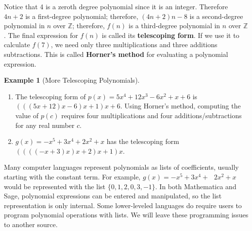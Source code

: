 \documentclass[10pt,]{book}
\newcommand{\terminology}[1]{\textbf{#1}}
\theoremstyle{plain}
\theoremstyle{definition}
\theoremstyle{definition}
\theoremstyle{definition}
\newtheorem{example}[theorem]{Example}
\theoremstyle{definition}
\numberwithin{equation}{section}
\begin{document}
Notice that 4 is a zeroth degree polynomial since it is an integer. Therefore \(4n + 2\) is a first-degree polynomial; therefore,
\((4n + 2) n - 8\) is a second-degree polynomial in \(n\) over \(\mathbb{Z}\); therefore, \(f(n)\) is a third-degree polynomial in \(n\) over \(\mathbb{Z}\). The final expression for \(f(n)\) is called its \terminology{telescoping form}. If we use it to calculate \(f(7)\),
we need only three multiplications and three additions subtractions. This is called \terminology{Horner's method} for evaluating a polynomial expression.%
\begin{example}[More Telescoping Polynomials]\label{ex-more-telescoping_}
\leavevmode%
\begin{enumerate}[label=\alph*]
\item\hypertarget{li-6}{} The telescoping form of \(p(x) = 5x^4 + 12x^3 -6x^2 + x + 6\) is \((((5x + 12) x - 6) x + 1) x + 6\). Using Horner's method, computing the value of \(p(c)\) requires four multiplications and four additions/subtractions for any real number \(c\).%
\item\hypertarget{li-7}{}\(g(x) = -x^5 + 3x^4 + 2x^2 + x\) has the telescoping form \(((((- x + 3) x ) x + 2) x + 1) x\).%
\end{enumerate}
%
\end{example}
\par
Many computer languages represent polynomials as lists of coefficients, usually starting with the constant term. For example, \(g(x) = -x^5 +
3x^4 +\text{  }2x^2 + x\)  would be represented with the list \(\{0,1,2,0,3,-1\}\). In both Mathematica and Sage, polynomial expressions can be entered and manipulated, so the list representation is only internal. Some lower-leveled languages do require users to program polynomial operations with lists. We will leave these programming issues to another source.%
\typeout{************************************************}
\typeout{************************************************}
\end{document}
